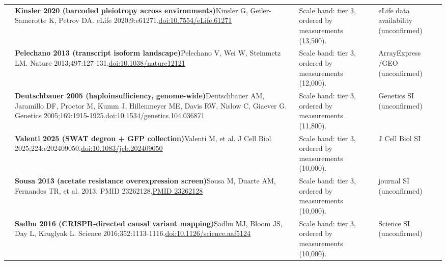 \begin{landscape}
\begin{longtable}{@{}r@{\hspace{4pt}} L{86mm} L{92mm} L{62mm}@{}}
 & \textbf{Kinsler 2020 (barcoded pleiotropy across environments)}\newline Kinsler G, Geiler-Samerotte K, Petrov DA. eLife 2020;9:e61271.\newline \href{https://doi.org/10.7554/eLife.61271}{doi:10.7554/\allowbreak eLife.61271} & Scale band: tier 3, ordered by measurements (13,500). & eLife data availability (unconfirmed) \\
 & \textbf{Pelechano 2013 (transcript isoform landscape)}\newline Pelechano V, Wei W, Steinmetz LM. Nature 2013;497:127-131.\newline \href{https://doi.org/10.1038/nature12121}{doi:10.1038/\allowbreak nature12121} & Scale band: tier 3, ordered by measurements (12,000). & ArrayExpress /\allowbreak  GEO (unconfirmed) \\
 & \textbf{Deutschbauer 2005 (haploinsufficiency, genome-wide)}\newline Deutschbauer AM, Jaramillo DF, Proctor M, Kumm J, Hillenmeyer ME, Davis RW, Nislow C, Giaever G. Genetics 2005;169:1915-1925.\newline \href{https://doi.org/10.1534/genetics.104.036871}{doi:10.1534/\allowbreak genetics.104.036871} & Scale band: tier 3, ordered by measurements (11,800). & Genetics SI (unconfirmed) \\
 & \textbf{Valenti 2025 (SWAT degron + GFP collection)}\newline Valenti M, et al. J Cell Biol 2025;224:e202409050.\newline \href{https://doi.org/10.1083/jcb.202409050}{doi:10.1083/\allowbreak jcb.202409050} & Scale band: tier 3, ordered by measurements (10,000). & J Cell Biol SI \\
 & \textbf{Sousa 2013 (acetate resistance overexpression screen)}\newline Sousa M, Duarte AM, Fernandes TR, et al. 2013. PMID 23262128.\newline \href{https://pubmed.ncbi.nlm.nih.gov/23262128/}{PMID 23262128} & Scale band: tier 3, ordered by measurements (10,000). & journal SI (unconfirmed) \\
 & \textbf{Sadhu 2016 (CRISPR-directed causal variant mapping)}\newline Sadhu MJ, Bloom JS, Day L, Kruglyak L. Science 2016;352:1113-1116.\newline \href{https://doi.org/10.1126/science.aaf5124}{doi:10.1126/\allowbreak science.aaf5124} & Scale band: tier 3, ordered by measurements (10,000). & Science SI (unconfirmed) \\

\end{longtable}
\end{landscape}
